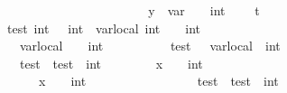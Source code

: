 \begin{isabellebody}
\ \ \ \ \ \ \ \ \ \ \ \ \isanewline
\ \ \ \ \ \ \ \ \ \isanewline
\ \ \ \ \ \ \ \ y\ {\isacharequal}{\kern0pt}\ {\isacartoucheopen}var{}\ {\isacharplus}{\kern0pt}\ {}\ {\isacharcolon}{\kern0pt}{\isacharcolon}{\kern0pt}\ int{\isacartoucheclose}{\isacharsemicolon}{\kern0pt}\ \isanewline
\ \ \ t{}{\isacharcolon}{\kern0pt}\isanewline
\ \ \ \ \ \ \ \ test\ {\isacharcolon}{\kern0pt}int\ {\isacharequal}{\kern0pt}\ {\isacartoucheopen}{\isacharminus}{\kern0pt}{}\ {\isacharcolon}{\kern0pt}{\isacharcolon}{\kern0pt}int{\isacartoucheclose}\ \ var{\isacharunderscore}{\kern0pt}local\ {\isacharcolon}{\kern0pt}int\ {\isacharequal}{\kern0pt}\ {\isacartoucheopen}{}\ {\isacharcolon}{\kern0pt}{\isacharcolon}{\kern0pt}\ int{\isacartoucheclose}\ \ \ \isanewline
\ \ \ \ \ \ \ \ \isanewline
\ \ \ \ \ \ \ \ \ \ var{\isacharunderscore}{\kern0pt}local\ {\isacharequal}{\kern0pt}\ {\isacartoucheopen}{\isacharparenleft}{\kern0pt}{}{\isacharplus}{\kern0pt}{}{}{\isacharparenright}{\kern0pt}\ {\isacharcolon}{\kern0pt}{\isacharcolon}{\kern0pt}\ int{\isacartoucheclose}{\isacharsemicolon}{\kern0pt}\isanewline
\ \ \ \ \ \ \ \ \ \ test\ {\isacharequal}{\kern0pt}\ {\isacartoucheopen}{}{\isacharasterisk}{\kern0pt}\ var{\isacharunderscore}{\kern0pt}local\ {\isacharcolon}{\kern0pt}{\isacharcolon}{\kern0pt}\ int{\isacartoucheclose}{\isacharsemicolon}{\kern0pt}\isanewline
\ \ \ \ \ \ \ \ \ \ test\ {\isacharequal}{\kern0pt}\ {\isacartoucheopen}test{\isacharplus}{\kern0pt}{}\ {\isacharcolon}{\kern0pt}{\isacharcolon}{\kern0pt}\ int{\isacartoucheclose}{\isacharsemicolon}{\kern0pt}\isanewline
\ \ \ \ \ \ \ \ {\isacartoucheopen}x\ {\isachargreater}{\kern0pt}\ {\isacharparenleft}{\kern0pt}{}\ {\isacharcolon}{\kern0pt}{\isacharcolon}{\kern0pt}\ int{\isacharparenright}{\kern0pt}{\isacartoucheclose}\ \isanewline
\ \ \ \ \ \ \ \ \ \ \ \isanewline
\ \ \ \ \ \ \ \ \ \ \ \ \ {\isacartoucheopen}x\ {\isachargreater}{\kern0pt}\ {\isacharparenleft}{\kern0pt}{}\ {\isacharcolon}{\kern0pt}{\isacharcolon}{\kern0pt}\ int{\isacharparenright}{\kern0pt}{\isacartoucheclose}\ \ \isanewline
\ \ \ \ \ \ \ \ \ \ \ \ \ \ \ test\ {\isacharequal}{\kern0pt}\ {\isacartoucheopen}test{\isacharminus}{\kern0pt}{}\ {\isacharcolon}{\kern0pt}{\isacharcolon}{\kern0pt}\ int{\isacartoucheclose}{\isacharsemicolon}{\kern0pt}\isanewline

\end{isabellebody}
